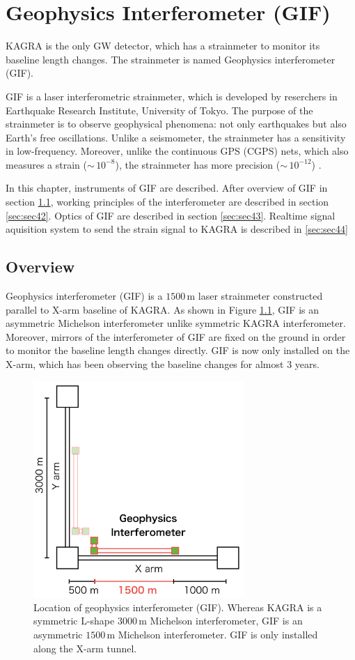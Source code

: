 \chapter{Geophysics Interferometer (GIF)} \label{chap3}
KAGRA is the only GW detector, which has a strainmeter to monitor its baseline length changes. The strainmeter is named Geophysics interferometer (GIF).

GIF is a laser interferometric strainmeter, which is developed by reserchers in Earthquake Research Institute, University of Tokyo. The purpose of the strainmeter is to observe geophysical phenomena: not only earthquakes but also Earth's free oscillations. Unlike a seismometer, the strainmeter has a sensitivity in low-frequency. Moreover, unlike the continuous GPS (CGPS) nets, which also measures a strain ($\sim\,10^{-8}$), the strainmeter has more precision ($\sim\,10^{-12}$) \cite{araya2007broadband}.

In this chapter, instruments of GIF are described. After overview of GIF in section \cref{sec:sec41}, working principles of the interferometer are described in section \cref{sec:sec42}. Optics of GIF are described in section \cref{sec:sec43}. Realtime signal aquisition system to send the strain signal to KAGRA is described in \cref{sec:sec44}

\section{Overview} \label{sec:sec41}
Geophysics interferometer (GIF) is a $1500\,\mathrm{m}$ laser strainmeter constructed parallel to X-arm baseline of KAGRA. As shown in Figure \ref{img:img402}, GIF is an asymmetric Michelson interferometer unlike symmetric KAGRA interferometer. Moreover, mirrors of the interferometer of GIF are fixed on the ground in order to monitor the baseline length changes directly. GIF is now only installed on the X-arm, which has been observing the baseline changes for almost 3 years.
\begin{figure}[h]
  \centering
  \includegraphics[width=8cm]{./img_chap4/img402.png}
  \caption{Location of geophysics interferometer (GIF). Whereas KAGRA is a symmetric L-shape $3000\,\mathrm{m}$ Michelson interferometer, GIF is an asymmetric $1500\,\mathrm{m}$ Michelson interferometer. GIF is only installed along the X-arm tunnel.} \label{img:img402}
\end{figure}

